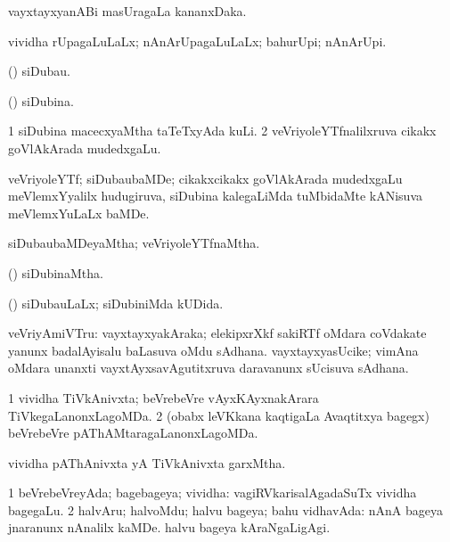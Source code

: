 \bentry
{} 
\gl{\nA}
\expl{(\bava)}
\bmng
 vayxtayxyanABi masUragaLa kananxDaka. 
\emng
\eentry

\bentry
{} 
\gl{\gu}
\expl{}
\bmng
 vividha rUpagaLuLaLx; nAnArUpagaLuLaLx; bahurUpi; nAnArUpi. 
\emng
\eentry

\bentry
{} 
\gl{\nA}
\expl{}
\bmng
 (\veYshA) siDubau. 
\emng
\eentry

\bentry
{} 
\gl{\gu}
\expl{}
\bmng
 (\veYshA) siDubina. 
\emng
\eentry

\bentry
{} 
\gl{\nA}
\expl{}
\bmng
\bnum
\num{1} siDubina macecxyaMtha taTeTxyAda kuLi. 
\num{2} veVriyoleYTfnalilxruva cikakx goVlAkArada mudedxgaLu. 
\enum
\emng
\eentry

\bentry
{} 
\gl{\nA}
\expl{}
\bmng
 veVriyoleYTf; siDubaubaMDe; cikakxcikakx goVlAkArada mudedxgaLu meVlemxYyalilx hudugiruva, siDubina kalegaLiMda tuMbidaMte kANisuva meVlemxYuLaLx baMDe. 
\emng
\eentry

\bentry
{} 
\gl{\gu}
\expl{}
\bmng
 siDubaubaMDeyaMtha; veVriyoleYTfnaMtha. 
\emng
\eentry

\bentry
{} 
\gl{\gu}
\expl{}
\bmng
 (\veYshA) siDubinaMtha. 
\emng
\eentry

\bentry
{} 
\gl{\gu}
\expl{}
\bmng
 (\veYshA) siDubauLaLx; siDubiniMda kUDida. 
\emng
\eentry

\bentry
{} 
\gl{\nA}
\expl{}
\bmng
 veVriyAmiVTru: 
\banum
{} vayxtayxyakAraka; elekipxrXkf sakiRTf oMdara coVdakate yanunx badalAyisalu baLasuva oMdu sAdhana. 
 vayxtayxyasUcike; vimAna oMdara unanxti vayxtAyxsavAgutitxruva daravanunx sUcisuva sAdhana. 
\eanum
\emng
\eentry

\bentry
{} 
\gl{\gu}
\expl{}
\bmng
\bnum
\num{1} vividha TiVkAnivxta; beVrebeVre vAyxKAyxnakArara TiVkegaLanonxLagoMDa. 
\num{2} (obabx leVKkana kaqtigaLa Avaqtitxya bagegx) beVrebeVre pAThAMtaragaLanonxLagoMDa. 
\enum
\emng
\eentry

\bentry
{} 
\gl{\nA}
\expl{}
\bmng
 vividha pAThAnivxta yA TiVkAnivxta garxMtha. 
\emng
\eentry

\bentry
{} 
\gl{\gu}
\expl{}
\bmng
\bnum
\num{1} beVrebeVreyAda; bagebageya; vividha:  vagiRVkarisalAgadaSuTx vividha bagegaLu. 
\num{2} halvAru; halvoMdu; halvu bageya; bahu vidhavAda:  nAnA bageya jnaranunx nAnalilx kaMDe.  halvu bageya kAraNgaLigAgi. 
\enum
\emng
\eentry

